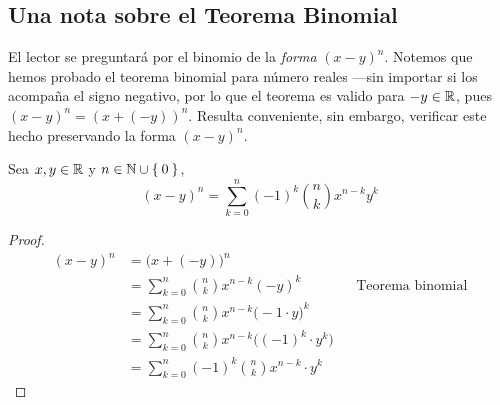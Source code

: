 \subsection*{Una nota sobre el Teorema Binomial}

El lector se preguntará por el binomio de la \textit{forma} $(x-y)^n$. Notemos que hemos probado el teorema binomial para número reales ---sin importar si los acompaña el signo negativo, por lo que el teorema es valido para $-y\in \mathbb{R}$, pues $(x-y)^n = (x + (-y))^n$. Resulta conveniente, sin embargo, verificar este hecho preservando la forma $(x-y)^n$.
  
Sea $x,y\in \mathbb{R}$ y $n\in \mathbb{N}\cup\Set{0}$,
\[(x- y)^n = \sum_{k=0}^{n} (-1)^k \binom{n}{k} x^{n-k}y^k\]

\begin{proof}\leavevmode
  \begin{align*}
    (x- y)^n &= \Big(x+(-y)\Big)^n\\
    &= \sum_{k=0}^{n} \binom{n}{k} x^{n-k} (-y)^k && \text{Teorema binomial}\\
    &= \sum_{k=0}^{n} \binom{n}{k} x^{n-k} \big(-1\cdot y\big)^k\\
    &= \sum_{k=0}^{n} \binom{n}{k} x^{n-k} \Big((-1)^k \cdot y^k\Big)\\
    &= \sum_{k=0}^{n} (-1)^k \binom{n}{k} x^{n-k}\cdot y^k
  \end{align*}
\end{proof}